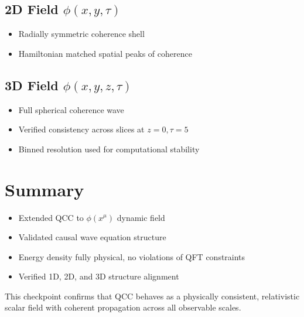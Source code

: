 \documentclass{article}
\begin{document}
\subsection*{2D Field \( \phi(x, y, \tau) \)}
\begin{itemize}
\item Radially symmetric coherence shell
\item Hamiltonian matched spatial peaks of coherence
\end{itemize}

\subsection*{3D Field \( \phi(x, y, z, \tau) \)}
\begin{itemize}
\item Full spherical coherence wave
\item Verified consistency across slices at \( z = 0, \tau = 5 \)
\item Binned resolution used for computational stability
\end{itemize}

\section*{Summary}
\begin{itemize}
\item Extended QCC to \( \phi(x^\mu) \) dynamic field
\item Validated causal wave equation structure
\item Energy density fully physical, no violations of QFT constraints
\item Verified 1D, 2D, and 3D structure alignment
\end{itemize}

This checkpoint confirms that QCC behaves as a physically consistent, relativistic scalar field with coherent propagation across all observable scales.
\end{document}

